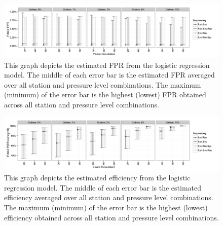 \documentclass[12pt]{article}
\begin{document}
\begin{figure}[h!]
	\centering
	\includegraphics[width=\textwidth]{FPR_Order_Plot_BW}
	\caption{This graph depicts the estimated FPR from the logistic regression model.  The middle of each error bar is the estimated FPR averaged over all station and pressure level combinations.  The maximum (minimum) of the error bar is the highest (lowest) FPR obtained across all station and pressure level combinations.}
	\label{fig:fitFPR}
\end{figure}


\begin{figure}[h!]
	\centering
	\includegraphics[width=\textwidth]{Efficiency_Order_Plot_BW}
	\caption{This graph depicts the estimated efficiency from the logistic regression model.  The middle of each error bar is the estimated efficiency averaged over all station and pressure level combinations.  The maximum (minimum) of the error bar is the highest (lowest) efficiency obtained across all station and pressure level combinations.}
	\label{fig:fitEffOrd}
\end{figure}
\end{document}
